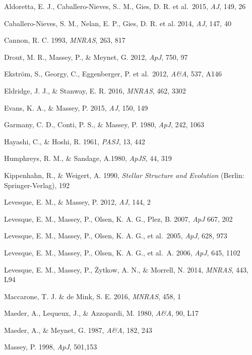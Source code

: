 \documentclass{iau}
\begin{document}
\begin{thebibliography}{}

\bibitem[]{}Aldoretta, E. J., Caballero-Nieves, S.. M., Gies, D. R. et al.\ 2015, \textit{AJ}, 149, 26

\bibitem[]{}Caballero-Nieves, S. M., Nelan, E. P., Gies, D. R. et al. 2014, \textit{AJ}, 147, 40

\bibitem[]{}Cannon, R. C. 1993, \textit{MNRAS}, 263, 817

\bibitem[]{}Drout, M. R., Massey, P., \& Meynet, G. 2012, \textit{ApJ}, 750, 97

\bibitem[]{}Ekstr{\"o}m, S., Georgy, C., Eggenberger, P. et al.\ 2012, \textit{A\&A}, 537, A146

\bibitem[]{}Eldridge, J. J., \& Stanway, E. R. 2016, \textit{MNRAS}, 462, 3302

\bibitem[]{}Evans, K. A., \& Massey, P. 2015, \textit{AJ}, 150, 149

\bibitem[]{}Garmany, C. D., Conti, P. S., \& Massey, P. 1980, \textit{ApJ}, 242, 1063

\bibitem[]{}Hayashi, C., \& Hoshi, R. 1961, \textit{PASJ}, 13, 442

\bibitem[]{}Humphreys, R. M., \& Sandage, A.1980, \textit{ApJS}, 44, 319

{Kippenhahn, R., \& Weigert, A.} 1990, \textit{Stellar Structure and Evolution} (Berlin: Springer-Verlag), 192

\bibitem[]{}Levesque, E. M., \& Massey, P. 2012, \textit{AJ}, 144, 2

\bibitem[]{}Levesque, E. M., Massey, P., Olsen, K. A. G., Plez, B. 2007, \textit{ApJ} 667, 202

\bibitem[]{}Levesque, E. M., Massey, P., Olsen, K. A. G., et al.\  2005, \textit{ApJ}, 628, 973

\bibitem[]{}Levesque, E. M., Massey, P., Olsen, K. A. G., et al.\  A. 2006, \textit{ApJ}, 645, 1102

\bibitem[]{}Levesque, E. M., Massey, P., \.{Z}ytkow, A. N., \& Morrell, N. 2014, \textit{MNRAS}, 443, L94

\bibitem[]{}Maccarone, T. J. \& de Mink, S. E. 2016, \textit{MNRAS}, 458, 1

{Maeder, A., Lequeux, J., \& Azzopardi, M.} 1980, \textit{A\&A}, 90, L17

\bibitem[]{}Maeder, A., \& Meynet, G. 1987, \textit{A\&A}, 182, 243

\bibitem[]{}Massey, P. 1998, \textit{ApJ}, 501,153


\end{thebibliography}
\end{document}
